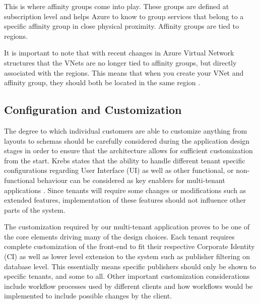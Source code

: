 This is where affinity groups come into play. These groups are defined at subscription level and helps Azure to know to group services that belong to a specific affinity group in close physical proximity. Affinity groups are tied to regions.
 
It is important to note that with recent changes in Azure Virtual Network structures that the VNets are no longer tied to affinity groups, but directly associated with the regions. This means that when you create your VNet and affinity group, they should both be located in the same region \cite{Microsoft_Corporation2014-dn}.

\subsection{Configuration and Customization}
\label{sec:custandconf}

The degree to which individual customers are able to customize anything from layouts to schemas should be carefully considered during the application design stages in order to ensure that the architecture allows for sufficient customization from the start. Krebs states that the ability to handle different tenant specific configurations regarding User Interface (UI) as well as other functional, or non-functional behaviour can be considered as key enablers for multi-tenant applications \cite{Krebs2012}. Since tenants will require some changes or modifications such as extended features, implementation of these features should not influence other parts of the system.
 
The customization required by our multi-tenant application proves to be one of the core elements driving many of the design choices. Each tenant requires complete customization of the front-end to fit their respective Corporate Identity (CI) as well as lower level extension to the system such as publisher filtering on database level. This essentially means specific publishers should only be shown to specific tenants, and some to all. Other important customization considerations include workflow processes used by different clients and how workflows would be implemented to include possible changes by the client.


